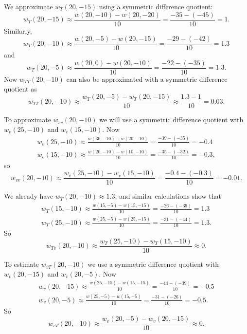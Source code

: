 \begin{activitySolution}
\ba
\item We approximate $w_T(20,-15)$ using a symmetric difference quotient: 
\[w_T(20,-15) \approx \frac{w(20,-10)-w(20,-20)}{10} = \frac{-35-(-45)}{10} = 1.\]
Similarly,
\[w_T(20,-10) \approx \frac{w(20,-5)-w(20,-15)}{10} = \frac{-29-(-42)}{10} = 1.3\]
and
\[w_T(20,-5) \approx \frac{w(20,0)-w(20,-10)}{10} = \frac{-22-(-35)}{10} = 1.3.\]
Now $w_{TT}(20,-10)$ can also be approximated with a symmetric difference quotient as
\[w_{TT}(20,-10) \approx \frac{w_T(20,-5) - w_T(20,-15)}{10} \approx \frac{1.3-1}{10} = 0.03.\]

\item To approximate $w_{vv}(20,-10)$ we will use a symmetric difference quotient with $w_v(25,-10)$ and $w_v(15,-10)$. Now
\begin{align*}
w_v(25,-10) \approx \frac{w(30,-10) - w(20,-10)}{10} = \frac{-39-(-35)}{10} = -0.4 \\
w_v(15,-10) \approx \frac{w(20,-10) - w(10,-10)}{10} = \frac{-35-(-32)}{10} = -0.3,
\end{align*}
so
\[w_{vv}(20,-10) \approx \frac{w_v(25,-10) - w_v(15,-10)}{10} = \frac{-0.4-(-0.3)}{10} = -0.01.\]


\item We already have $w_T(20,-10) \approx 1.3$, and similar calculations show that 
\begin{align*}
w_T(15,-10) \approx \frac{w(15,-5)-w(15,-15)}{10} = \frac{-26-(-39)}{10} = 1.3 \\
w_T(25,-10) \approx \frac{w(25,-5)-w(25,-15)}{10} = \frac{-31-(-44)}{10} = 1.3.
\end{align*}
So 
\[w_{Tv}(20,-10) \approx \frac{w_T(25,-10) - w_T(15,-10)}{10} \approx 0.\]

\item To estimate $w_{vT}(20,-10)$ we use a symmetric difference quotient with $w_v(20,-15)$ and $w_v(20,-5)$. Now
\begin{align*}
w_v(20,-15) \approx \frac{w(25,-15)-w(15,-15)}{10} = \frac{-44-(-39)}{10} = -0.5 \\
w_v(20,-5) \approx \frac{w(25,-5)-w(15,-5)}{10} = \frac{-31-(-26)}{10} = -0.5.
\end{align*}
So 
\[w_{vT}(20,-10) \approx \frac{w_v(20,-5) - w_v(20,-15)}{10} \approx 0.\]


\end{activitySolution}
